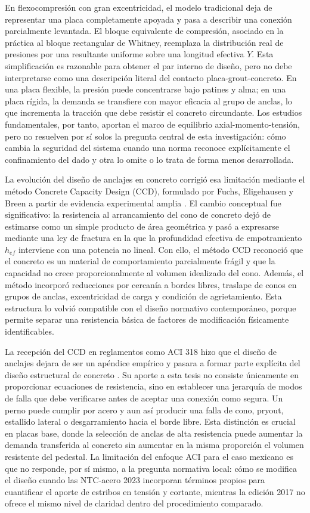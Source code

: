 En flexocompresión con gran excentricidad, el modelo tradicional deja de representar una placa
completamente apoyada y pasa a describir una conexión parcialmente levantada. El bloque equivalente
de compresión, asociado en la práctica al bloque rectangular de Whitney, reemplaza la distribución
real de presiones por una resultante uniforme sobre una longitud efectiva $Y$. Esta simplificación
es razonable para obtener el par interno de diseño, pero no debe interpretarse como una descripción
literal del contacto placa-grout-concreto. En una placa flexible, la presión puede concentrarse
bajo patines y alma; en una placa rígida, la demanda se transfiere con mayor eficacia al grupo de
anclas, lo que incrementa la tracción que debe resistir el concreto circundante. Los estudios
fundamentales, por tanto, aportan el marco de equilibrio axial-momento-tensión, pero no resuelven por sí
solos la pregunta central de esta investigación: cómo cambia la seguridad del sistema cuando una
norma reconoce explícitamente el confinamiento del dado y otra lo omite o lo trata de forma menos
desarrollada.

La evolución del diseño de anclajes en concreto corrigió esa limitación mediante el método
Concrete Capacity Design (CCD), formulado por Fuchs, Eligehausen y Breen a partir de evidencia
experimental amplia \cite{FuchsEligehausenBreen_1995}. El cambio conceptual fue significativo: la
resistencia al arrancamiento del cono de concreto dejó de estimarse como un simple producto de
área geométrica y pasó a expresarse mediante una ley de fractura en la que la profundidad efectiva
de empotramiento $h_{ef}$ interviene con una potencia no lineal. Con ello, el método CCD reconoció
que el concreto es un material de comportamiento parcialmente frágil y que la capacidad no crece proporcionalmente al volumen
idealizado del cono. Además, el método incorporó reducciones por cercanía a bordes libres,
traslape de conos en grupos de anclas, excentricidad de carga y condición de agrietamiento. Esta
estructura lo volvió compatible con el diseño normativo contemporáneo, porque permite separar una
resistencia básica de factores de modificación físicamente identificables.

La recepción del CCD en reglamentos como ACI 318 hizo que el diseño de anclajes dejara de ser un
apéndice empírico y pasara a formar parte explícita del diseño estructural de concreto
\cite{ACI318_2019}. Su aporte a esta tesis no consiste únicamente en proporcionar ecuaciones de
resistencia, sino en establecer una jerarquía de modos de falla que debe verificarse antes de
aceptar una conexión como segura. Un perno puede cumplir por acero y aun así producir una falla de
cono, pryout, estallido lateral o desgarramiento hacia el borde libre. Esta distinción es crucial
en placas base, donde la selección de anclas de alta resistencia puede aumentar la demanda
transferida al concreto sin aumentar en la misma proporción el volumen resistente del pedestal. La
limitación del enfoque ACI para el caso mexicano es que no responde, por sí mismo, a la pregunta
normativa local: cómo se modifica el diseño cuando las NTC-acero 2023 incorporan términos propios
para cuantificar el aporte de estribos en tensión y cortante, mientras la edición 2017 no ofrece
el mismo nivel de claridad dentro del procedimiento comparado.

